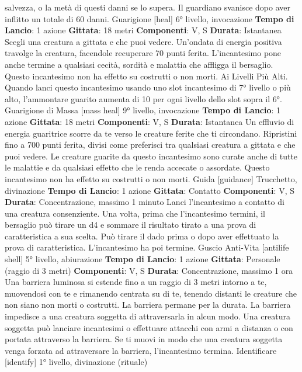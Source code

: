\begin{multicols}{2}
salvezza, o la metà di questi danni se lo supera. Il
guardiano svanisce dopo aver inflitto un totale di 60
danni.
Guarigione
[heal]
6° livello, invocazione
\textbf{Tempo di Lancio}: 1 azione
\textbf{Gittata}: 18 metri
\textbf{Componenti}: V, S
\textbf{Durata}: Istantanea
Scegli una creatura a gittata e che puoi vedere.
Un’ondata di energia positiva travolge la creatura,
facendole recuperare 70 punti ferita. L’incantesimo
pone anche termine a qualsiasi cecità, sordità e
malattia che affligga il bersaglio. Questo incantesimo
non ha effetto su costrutti o non morti.
Ai Livelli Più Alti. Quando lanci questo incantesimo
usando uno slot incantesimo di 7° livello o più alto,
l’ammontare guarito aumenta di 10 per ogni livello dello
slot sopra il 6°.
Guarigione di Massa
[mass heal]
9° livello, invocazione
\textbf{Tempo di Lancio}: 1 azione
\textbf{Gittata}: 18 metri
\textbf{Componenti}: V, S
\textbf{Durata}: Istantanea
Un effluvio di energia guaritrice scorre da te verso le
creature ferite che ti circondano. Ripristini fino a 700
punti ferita, divisi come preferisci tra qualsiasi creatura
a gittata e che puoi vedere. Le creature guarite da
questo incantesimo sono curate anche di tutte le
malattie e da qualsiasi effetto che le renda accecate o
assordate. Questo incantesimo non ha effetto su
costrutti o non morti.
Guida
[guidance]
Trucchetto, divinazione
\textbf{Tempo di Lancio}: 1 azione
\textbf{Gittata}: Contatto
\textbf{Componenti}: V, S
\textbf{Durata}: Concentrazione, massimo 1 minuto
Lanci l’incantesimo a contatto di una creatura
consenziente. Una volta, prima che l’incantesimo
termini, il bersaglio può tirare un d4 e sommare il
risultato tirato a una prova di caratteristica a sua scelta.
Può tirare il dado prima o dopo aver effettuato la prova
di caratteristica. L’incantesimo ha poi termine.
Guscio Anti-Vita
[antilife shell]
5° livello, abiurazione
\textbf{Tempo di Lancio}: 1 azione
\textbf{Gittata}: Personale (raggio di 3 metri)
\textbf{Componenti}: V, S
\textbf{Durata}: Concentrazione, massimo 1 ora
Una barriera luminosa si estende fino a un raggio di 3
metri intorno a te, muovendosi con te e rimanendo
centrata su di te, tenendo distanti le creature che non
siano non morti o costrutti. La barriera permane per la
durata.
La barriera impedisce a una creatura soggetta di
attraversarla in alcun modo. Una creatura soggetta può
lanciare incantesimi o effettuare attacchi con armi a
distanza o con portata attraverso la barriera.
Se ti muovi in modo che una creatura soggetta venga
forzata ad attraversare la barriera, l’incantesimo
termina.
Identificare
[identify]
1° livello, divinazione (rituale)

\end{multicols}
